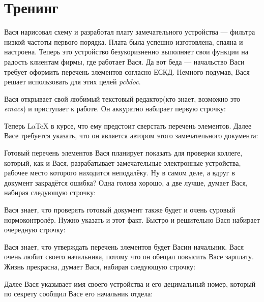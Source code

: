 
\section{Тренинг}

Вася нарисовал схему и разработал плату замечательного устройства --- фильтра
низкой частоты первого порядка. Плата была успешно изготовлена, спаяна и
настроена. Теперь это устройство безукоризненно выполняет свои функции на радость
клиентам фирмы, где работает Вася. Да вот беда --- начальство Васи требует
оформить перечень элементов согласно ЕСКД. Немного подумав, Вася решает
использовать для этих целей \emph{pcbdoc}.

Вася открывает свой любимый текстовый редактор(кто знает, возможно это
\emph{emacs}) и приступает к работе. Он аккуратно набирает первую строчку:


Теперь \LaTeX{} в курсе, что ему предстоит сверстать перечень элементов.
Далее Васе требуется указать, что он является автором этого замечательного
документа:


Готовый перечень элементов Вася планирует показать для проверки коллеге, который,
как и Вася, разрабатывает замечательные электронные устройства, рабочее место
которого находится неподалёку. Ну в самом деле, а вдруг в документ закрадётся
ошибка? Одна голова хорошо, а две лучше, думает Вася, набирая следующую
строчку:


Вася знает, что проверять готовый документ также будет и очень суровый
нормоконтролёр. Нужно указать и этот факт. Быстро и решительно Вася набирает
очередную строчку:


Вася знает, что утверждать перечень элементов будет Васин начальник. Вася очень
любит своего начальника, потому что он обещал повысить Васе зарплату. Жизнь
прекрасна, думает Вася, набирая следующую строчку:


Далее Вася указывает имя своего устройства и его децимальный номер, который
по секрету сообщил Васе его начальник отдела:


